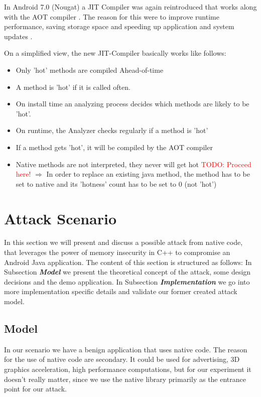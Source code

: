 In Android 7.0 (Nougat) a JIT Compiler was again reintroduced that works along with the AOT compiler \cite{Android7ForDevelopers}. The reason for this were to improve runtime performance, saving storage space and speeding up application and system updates \cite{JitWorkFlow}.

On a simplified view, the new JIT-Compiler basically works like follows:  


    \begin{itemize}
    	\item Only 'hot' methods are compiled Ahead-of-time 
    	\item A method is 'hot' if it is called often.
    	\item On install time an analyzing process decides which methods are likely to be 'hot'.
    	\item On runtime, the Analyzer checks regularly if a method is 'hot'
    	\item If a method gets 'hot', it will be compiled by the AOT compiler
    	\item Native methods are not interpreted, they never will get hot \newline
    	\textcolor{red}{TODO: Proceed here!}
    	$\Rightarrow$ In order to replace an existing java method, the method has to be set to native and its 'hotness' count has to be set to 0 (not 'hot')
    \end{itemize}


\section{Attack Scenario}
In this section we will present and discuss a possible attack from native code, that leverages the power of memory insecurity in C++ to compromise an Android Java application. The content of this section is structured as follows: In Subsection \emph{\textbf{Model}} we present the theoretical concept of the attack, some design decisions and the demo application. 
In Subsection \emph{\textbf{Implementation}} we go into more implementation specific details and validate our former created attack model.

\subsection{Model}

In our scenario we have a benign application that uses native code.
The reason for the use of native code are secondary. It could be used for advertising, 3D graphics acceleration, high performance computations, but for our experiment it doesn't really matter, since we use the native library primarily as the entrance point for our attack.

